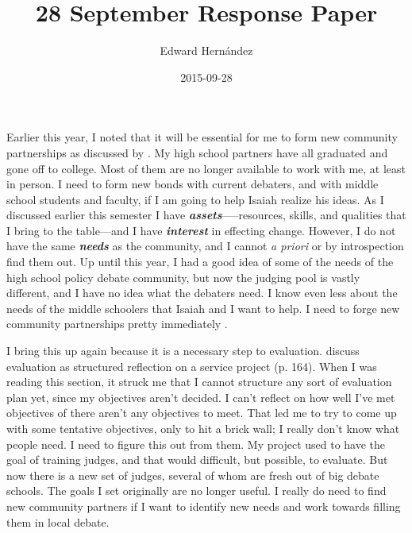 \documentclass[man,12pt,natbib]{apa6}
\begin{document}
\title{28 September Response Paper}
\author{Edward Hern\'{a}ndez}
\date{2015-09-28}
\maketitle

Earlier this year, I noted that it will be essential for me to form new
community partnerships as discussed by \citet{Cress13}. 
My high school partners have all graduated and gone off to college. Most of
them are no longer available to work with me, at least in person.  I need to
form new bonds with current debaters, and with middle school students and
faculty, if I am going to help Isaiah realize his ideas. As I discussed earlier
this semester I have \textit{\textbf{assets}}—--resources, skills, and
qualities that I bring to the table—and I have \textit{\textbf{interest}} in
effecting change. However, I do not have the same \textit{\textbf{needs}} as
the community, and I cannot \emph{a priori} or by introspection find them out.
Up until this year, I had a good idea of some of the needs of the high school
policy debate community, but now the judging pool is vastly different, and I
have no idea what the debaters need. 
I know even less about the needs of the middle schoolers that Isaiah and I want
to help. I need to forge new community partnerships pretty immediately
\citep{Cress13}.

I bring this up again because it is a necessary step to evaluation.
\citet{Cress13} discuss evaluation as structured reflection on a service
project (p. 164). When I was reading this section, it struck me that I cannot
structure any sort of evaluation plan yet, since my objectives aren't decided.
I can't reflect on how well I've met objectives of there aren't any objectives
to meet. That led me to try to come up with some tentative objectives, only to
hit a brick wall; I really don't know what people need. 
I need to figure this out from them. My project used to have the goal of
training judges, and that would difficult, but possible, to evaluate.  But now
there is a new set of judges, several of whom are fresh out of big debate
schools. The goals I set originally are no longer useful. I really do need to
find new community partners if I want to identify new needs and work towards
filling them in local debate.
\end{document}
